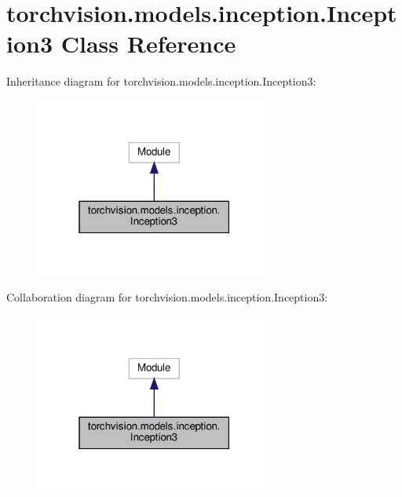 \hypertarget{classtorchvision_1_1models_1_1inception_1_1Inception3}{}\section{torchvision.\+models.\+inception.\+Inception3 Class Reference}
\label{classtorchvision_1_1models_1_1inception_1_1Inception3}


Inheritance diagram for torchvision.\+models.\+inception.\+Inception3\+:
\nopagebreak
\begin{figure}[H]
\begin{center}
\leavevmode
\includegraphics[width=223pt]{classtorchvision_1_1models_1_1inception_1_1Inception3__inherit__graph}
\end{center}
\end{figure}


Collaboration diagram for torchvision.\+models.\+inception.\+Inception3\+:
\nopagebreak
\begin{figure}[H]
\begin{center}
\leavevmode
\includegraphics[width=223pt]{classtorchvision_1_1models_1_1inception_1_1Inception3__coll__graph}
\end{center}
\end{figure}
